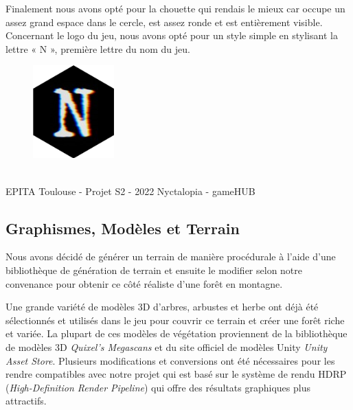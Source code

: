 \newline
Finalement nous avons opté pour la chouette qui rendais le mieux car occupe un assez grand espace dans le cercle, est assez ronde et est entièrement visible.
Concernant le logo du jeu, nous avons opté pour un style simple en stylisant la lettre « N », première lettre du nom du jeu.

\newline
\begin{figure}[H]
\centering
\begin{minipage}{.5\textwidth}
  \centering
  \centerline{\includegraphics[width=0.5\linewidth]{img/logos/logojeu.png}}
  \label{fig:logonyctalopia}
\end{minipage}%
\end{figure}

\vfill
\noindent\makebox[\linewidth]{\rule{.8\paperwidth}{.6pt}}\\[0.2cm]
EPITA Toulouse - Projet S2 - 2022 \hfill Nyctalopia - gameHUB
\noindent\makebox[\linewidth]{\rule{.8\paperwidth}{.6pt}}

\subsection{Graphismes, Modèles et Terrain}
\setlength{\parindent}{5ex}
Nous avons décidé de générer un terrain de manière procédurale à l'aide d'une bibliothèque de génération de terrain et ensuite le modifier selon notre convenance pour obtenir ce côté réaliste d'une forêt en montagne.

Une grande variété de modèles 3D d’arbres, arbustes et herbe ont déjà été sélectionnés et utilisés dans le jeu pour couvrir ce terrain et créer une forêt riche et variée. La plupart de ces modèles de végétation proviennent de la bibliothèque de modèles 3D \emph{Quixel’s Megascans} et du site officiel de modèles Unity \emph{Unity Asset Store}. Plusieurs modifications et conversions ont été nécessaires pour les rendre compatibles avec notre projet qui est basé sur le système de rendu HDRP (\emph{High-Definition Render Pipeline}) qui offre des résultats graphiques plus attractifs.
\newline

